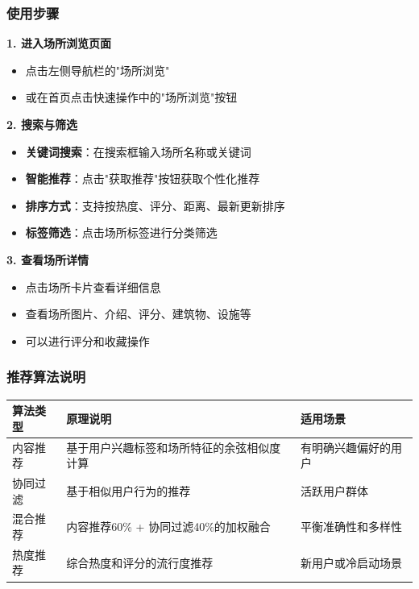 \documentclass[12pt, a4paper]{article}
\begin{document}
\subsubsection{使用步骤}

\textbf{1. 进入场所浏览页面}
\begin{itemize}
    \item 点击左侧导航栏的"场所浏览"
    \item 或在首页点击快速操作中的"场所浏览"按钮
\end{itemize}

\textbf{2. 搜索与筛选}
\begin{itemize}
    \item \textbf{关键词搜索}：在搜索框输入场所名称或关键词
    \item \textbf{智能推荐}：点击"获取推荐"按钮获取个性化推荐
    \item \textbf{排序方式}：支持按热度、评分、距离、最新更新排序
    \item \textbf{标签筛选}：点击场所标签进行分类筛选
\end{itemize}

\textbf{3. 查看场所详情}
\begin{itemize}
    \item 点击场所卡片查看详细信息
    \item 查看场所图片、介绍、评分、建筑物、设施等
    \item 可以进行评分和收藏操作
\end{itemize}

\subsubsection{推荐算法说明}

\begin{table}[H]
\centering
\begin{tabular}{lp{6cm}l}
\toprule
\rowcolor{primary!20}
\textbf{算法类型} & \textbf{原理说明} & \textbf{适用场景} \\
\midrule
内容推荐 & 基于用户兴趣标签和场所特征的余弦相似度计算 & 有明确兴趣偏好的用户 \\
\rowcolor{light}
协同过滤 & 基于相似用户行为的推荐 & 活跃用户群体 \\
混合推荐 & 内容推荐60\% + 协同过滤40\%的加权融合 & 平衡准确性和多样性 \\
\rowcolor{light}
热度推荐 & 综合热度和评分的流行度推荐 & 新用户或冷启动场景 \\
\bottomrule
\end{tabular}
\end{table}
\end{document}

